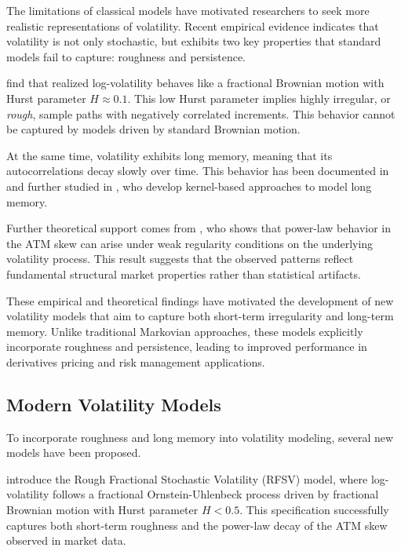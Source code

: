 The limitations of classical models have motivated researchers to seek more realistic representations of volatility. Recent empirical evidence indicates that volatility is not only stochastic, but exhibits two key properties that standard models fail to capture: roughness and persistence.

\citet{GatheralJaissonRosenbaum2018} find that realized log-volatility behaves like a fractional Brownian motion with Hurst parameter $H \approx 0.1$. This low Hurst parameter implies highly irregular, or \emph{rough}, sample paths with negatively correlated increments. This behavior cannot be captured by models driven by standard Brownian motion.

At the same time, volatility exhibits long memory, meaning that its autocorrelations decay slowly over time. This behavior has been documented in \citet{ComteRenault1998} and further studied in \citet{BennedsenLundePakkanen2021}, who develop kernel-based approaches to model long memory.

Further theoretical support comes from \citet{Fukasawa2017}, who shows that power-law behavior in the ATM skew can arise under weak regularity conditions on the underlying volatility process. This result suggests that the observed patterns reflect fundamental structural market properties rather than statistical artifacts.

These empirical and theoretical findings have motivated the development of new volatility models that aim to capture both short-term irregularity and long-term memory. Unlike traditional Markovian approaches, these models explicitly incorporate roughness and persistence, leading to improved performance in derivatives pricing and risk management applications.


\subsection{Modern Volatility Models} \label{subsec:ModernVolModels}

To incorporate roughness and long memory into volatility modeling, several new models have been proposed.

\citet{GatheralJaissonRosenbaum2018} introduce the Rough Fractional Stochastic Volatility (RFSV) model, where log-volatility follows a fractional Ornstein-Uhlenbeck process driven by fractional Brownian motion with Hurst parameter $H < 0.5$. This specification successfully captures both short-term roughness and the power-law decay of the ATM skew observed in market data.

